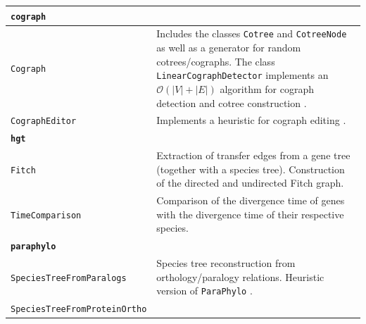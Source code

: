 \documentclass[hidelinks,11pt]{article}
\begin{document}
{\begin{longtable}{| p{4.0cm} | p{10cm} |}
	\hline
	\multicolumn{2}{|l|}{\textbf{\texttt{cograph}}}\\
	\hline
	\texttt{Cograph} &
	Includes the classes \texttt{Cotree} and \texttt{CotreeNode} as well as a 
	generator for random cotrees/cographs. The class 
	\texttt{LinearCographDetector} implements an $\mathcal{O}(|V|+|E|)$ algorithm 
	for cograph detection and cotree construction \citep{corneil1985}.\\
	\texttt{CographEditor} &
	Implements a heuristic for cograph editing \citep{crespelle2019}. \\
  \hline
  \multicolumn{2}{|l|}{\textbf{\texttt{hgt}}}\\
  \hline
  \texttt{Fitch} &
  Extraction of transfer edges from a gene tree (together with a species tree). 
  Construction of the directed and undirected Fitch graph.\\
  \texttt{TimeComparison} &
  Comparison of the divergence time of genes with the divergence time of their 
  respective species. \\
	\hline
	\multicolumn{2}{|l|}{\textbf{\texttt{paraphylo}}}\\
	\hline
	\texttt{SpeciesTreeFromParalogs} &
	Species tree reconstruction from orthology/paralogy relations. Heuristic version of \texttt{ParaPhylo} \cite{hellmuth2015}. \\
	\texttt{SpeciesTreeFrom\newline ProteinOrtho} &

\end{longtable}}
\end{document}
